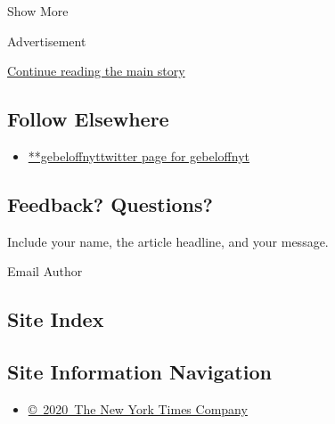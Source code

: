 Show More

Advertisement

\protect\hyperlink{after-mid2}{Continue reading the main story}

\hypertarget{follow-elsewhere}{%
\subsection{Follow Elsewhere}\label{follow-elsewhere}}

\begin{itemize}
\tightlist
\item
  \href{https://twitter.com/gebeloffnyt}{**gebeloffnyttwitter page for
  gebeloffnyt}
\end{itemize}

\hypertarget{feedback-questions}{%
\subsection{Feedback? Questions?}\label{feedback-questions}}

Include your name, the article headline, and your message.

Email Author

\hypertarget{site-index}{%
\subsection{Site Index}\label{site-index}}

\hypertarget{site-information-navigation}{%
\subsection{Site Information
Navigation}\label{site-information-navigation}}

\begin{itemize}
\tightlist
\item
  \href{https://help.nytimes.com/hc/en-us/articles/115014792127-Copyright-notice}{©~2020~The
  New York Times Company}
\end{itemize}

